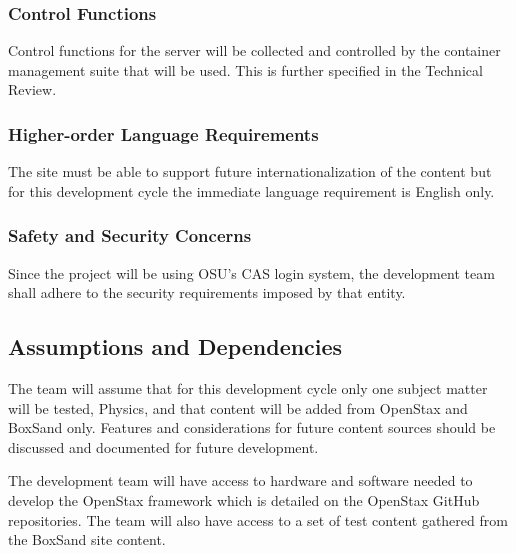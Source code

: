 \documentclass[onecolumn, draftclsnofoot,10pt, compsoc]{IEEEtran}
\begin{document}
\subsubsection{Control Functions}
Control functions for the server will be collected and controlled by the container management suite that will be used. This is further specified in the Technical Review.

\subsubsection{Higher-order Language Requirements}
The site must be able to support future internationalization of the content but for this development cycle the immediate language requirement is English only. 

\subsubsection{Safety and Security Concerns}
Since the project will be using OSU’s CAS login system, the development team shall adhere to the security requirements imposed by that entity.

\subsection{Assumptions and Dependencies}
The team will assume that for this development cycle only one subject matter will be tested, Physics, and that content will be added from OpenStax and BoxSand only. Features and considerations for future content sources should be discussed and documented for future development.

The development team will have access to hardware and software needed to develop the OpenStax framework which is detailed on the OpenStax GitHub repositories. The team will also have access to a set of test content gathered from the BoxSand site content. 
\end{document}

